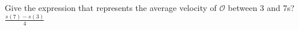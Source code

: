 {Give the expression that represents the average velocity of $\mathcal{O}$ between 3 and 7s?}
{$\frac{s(7)-s(3)}{4}$}